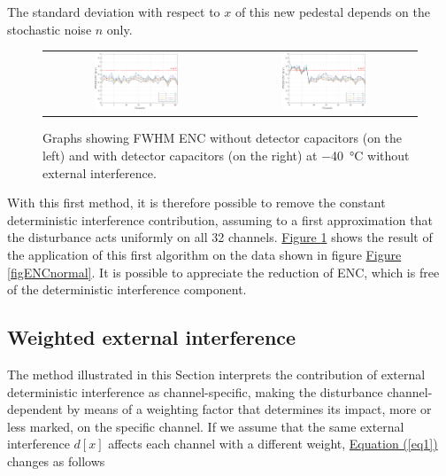 \noindent
The standard deviation with respect to $x$ of this new pedestal depends on the stochastic noise $n$ only.

\begin{figure}[h!]
    \centering
    \begin{tabular}{cc}
         \includegraphics[width=0.475\textwidth]{Images/chap1/results/ENC_minus40C/ASIC_cold_wocaps_wo_mean.pdf} &  \includegraphics[width=0.475\textwidth]{Images/chap1/results/ENC_minus40C/ASIC_cold_wcaps_wo_mean.pdf} \\
    \end{tabular}
    \caption{Graphs showing FWHM ENC without detector capacitors (on the left) and with detector capacitors (on the right) at \SI{-40}{\celsius} without external interference.}
    \label{figENCwomean}
\end{figure}

\noindent
With this first method, it is therefore possible to remove the constant deterministic interference contribution, assuming to a first approximation that the disturbance acts uniformly on all 32 channels. \hyperref[figENCwomean]{Figure \ref{figENCwomean}} shows the result of the application of this first algorithm on the data shown in figure \hyperref[figENCnormal]{Figure \ref{figENCnormal}}. It is possible to appreciate the reduction of ENC, which is free of the deterministic interference component.

\subsection{Weighted external interference}
The method illustrated in this Section interprets the contribution of external deterministic interference as channel-specific, making the disturbance channel-dependent by means of a weighting factor that determines its impact, more or less marked, on the specific channel. If we assume that the same external interference $d[x]$ affects each channel with a different weight, \hyperref[eq1]{Equation (\ref{eq1})} changes as follows

